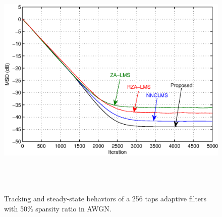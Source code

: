 \begin{figure}[!htb]
\begin{center}
\vspace{1cm}
\includegraphics[width=14.25cm, height=11cm]{Figures/Chapter5/fig9.eps}\\
\end{center}
\vspace{-1cm}
\caption{Tracking and steady-state behaviors of a 256 taps adaptive filters with 50\% sparsity ratio in AWGN.}
\label{fig9}
\vspace{1.5cm}
\end{figure}
